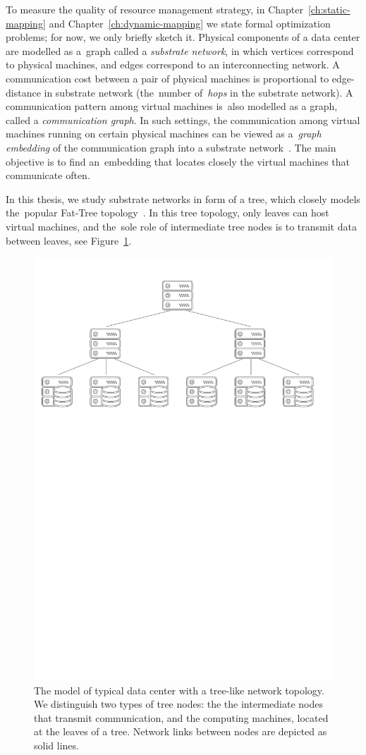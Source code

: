 To measure the quality of resource management strategy, in Chapter~\ref{ch:static-mapping} and Chapter~\ref{ch:dynamic-mapping} we state formal optimization problems; for now, we only briefly sketch it.
Physical components of a data center are modelled as a~graph called a \emph{substrate network}, in which vertices correspond to physical machines, and edges correspond to an interconnecting network.
A communication cost between a pair of physical machines is proportional to edge-distance in substrate network (the~number of~\emph{hops} in the substrate network).
A communication pattern among virtual machines is~also modelled as a graph, called a \emph{communication graph}.
In such settings, the communication among virtual machines running on certain physical machines can be viewed as a~\emph{graph embedding} of the communication graph into a substrate network~\cite{gupta2001provisioning}.
The main objective is to find an~embedding that locates closely the virtual machines that communicate often.

In this thesis, we study substrate networks in form of a tree, which closely models the~popular Fat-Tree topology~\cite{fat-trees}.
In this tree topology, only leaves can host virtual machines, and the~sole role of intermediate tree nodes is to transmit data between leaves, see Figure~\ref{fig:tree-topology}.


\begin{figure}[t]
\centering
\includegraphics[width=0.79\columnwidth]{figs/tree-topology.pdf}
\caption{The model of typical data center with a tree-like network topology. We distinguish two types of tree nodes: the the intermediate nodes that transmit communication, and the computing machines, located at the leaves of a tree. Network links between nodes are depicted as solid lines.}\label{fig:tree-topology}
\vspace{-1em}
\end{figure}


